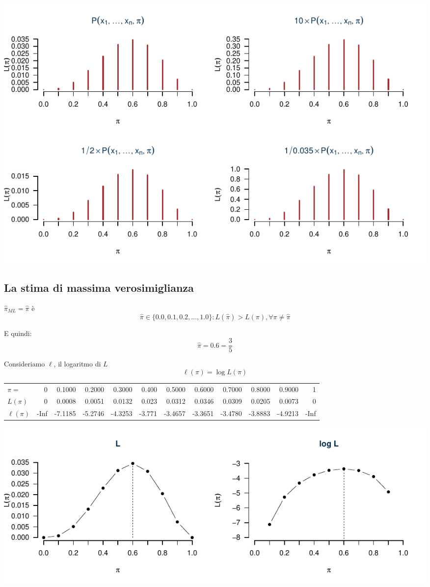 \documentclass[
  11pt,
]{book}
\theoremstyle{mytheoremstyle}
\theoremstyle{mydefstyle}
\begin{document}
\begin{center}\includegraphics{Appunti_di_Statistica_2025_files/figure-latex/12-Verosimiglianza-5-1} \end{center}

\subsection{La stima di massima verosimiglianza}\label{la-stima-di-massima-verosimiglianza}

\(\hat\pi_{ML}=\hat\pi\) è
\[\hat\pi\in\{0.0,0.1,0.2,...,1.0\}: L(\hat\pi)>L(\pi),\forall\pi\neq\hat\pi\]

E quindi:
\[\hat\pi=0.6=\frac 3 5\]

Consideriamo \(\ell\), il logaritmo di \(L\)
\[\ell(\pi)=\log L(\pi)\]

\begin{tabular}{lrrrrrrrrrrr}
\toprule
$\pi=$ & 0 & 0.1000 & 0.2000 & 0.3000 & 0.400 & 0.5000 & 0.6000 & 0.7000 & 0.8000 & 0.9000 & 1\\
$L(\pi)$ & 0 & 0.0008 & 0.0051 & 0.0132 & 0.023 & 0.0312 & 0.0346 & 0.0309 & 0.0205 & 0.0073 & 0\\
$\ell(\pi)$ & -Inf & -7.1185 & -5.2746 & -4.3253 & -3.771 & -3.4657 & -3.3651 & -3.4780 & -3.8883 & -4.9213 & -Inf\\
\bottomrule
\end{tabular}

\begin{center}\includegraphics{Appunti_di_Statistica_2025_files/figure-latex/12-Verosimiglianza-7-1} \end{center}
\end{document}
